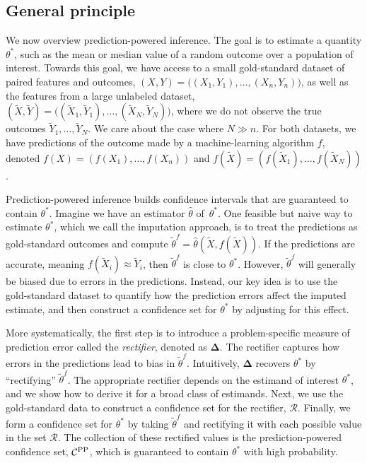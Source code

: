 \documentclass[10pt]{article}
\newcommand{\tX}{\widetilde{X}}
\newcommand{\tY}{\widetilde{Y}}
\newcommand{\Xt}{\widetilde{X}}
\newcommand{\Yt}{\widetilde{Y}}
\newcommand{\thetaf}{\tilde{\theta}^{f}}
\newcommand{\rec}{\mathbf{\Delta}}
\begin{document}
\subsection{General principle}
\label{subsec:principle}


We now overview prediction-powered inference.
The goal is to estimate a quantity $\theta^*$, such as the mean or median value of a random outcome over a population of interest. 
Towards this goal, we have access to a small gold-standard dataset of paired features and outcomes, $(X,Y) = \big( (X_1,Y_1), \ldots, (X_n, Y_n) \big)$, as well as the features from a large unlabeled dataset, $(\tX, \tY) = \big( (\tX_1, \tY_1), \ldots, (\tX_N, \tY_N) \big)$, where we do not observe the true outcomes $\tY_1,\dots,\tY_N$. 
We care about the case where $N \gg n$.
For both datasets, we have predictions of the outcome made by a machine-learning algorithm $f$, denoted $f(X) = (f(X_1),\dots,f(X_n))$ and $f(\Xt) = (f(\Xt_1),\dots,f(\Xt_N))$.

Prediction-powered inference builds confidence intervals that are guaranteed to contain $\theta^*$.
Imagine we have an estimator $\hat{\theta}$ of~$\theta^*$. 
One feasible but naive way to estimate $\theta^*$, which we call the imputation approach, is to treat the predictions as gold-standard outcomes and compute $\thetaf = \hat \theta(\Xt,f(\Xt))$. 
If the predictions are accurate, meaning $f(\Xt_i)\approx \Yt_i$, then $\thetaf$ is close to $\theta^*$.
However, $\thetaf$ will generally be biased due to errors in the predictions.
Instead, our key idea is to use the gold-standard dataset to quantify how the prediction errors affect the imputed estimate, and then construct a confidence set for $\theta^*$ by adjusting for this effect.

More systematically, the first step is to introduce a problem-specific measure of prediction error called the \emph{rectifier}, denoted as $\rec$.
The rectifier captures how errors in the predictions lead to bias in $\thetaf$. 
Intuitively, $\rec$ recovers $\theta^*$ by ``rectifying'' $\thetaf$.
The appropriate rectifier depends on the estimand of interest $\theta^*$, and we show how to derive it for a broad class of estimands.
Next, we use the gold-standard data to construct a confidence set for the rectifier, $\mathcal{R}$.
Finally, we form a confidence set for $\theta^*$ by taking $\thetaf$ and rectifying it with each possible value in the set $\mathcal{R}$.
The collection of these rectified values is the prediction-powered confidence set, $\mathcal{C}^{\rm PP}$, which is guaranteed to contain $\theta^*$ with high probability.
\end{document}
